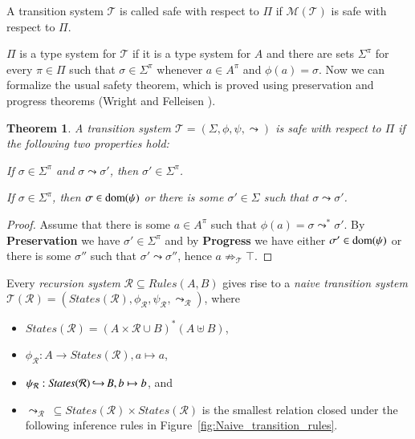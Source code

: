 \documentclass[a4paper,final,preprint,sort&compress]{elsarticle}
\newtheorem{theorem}[definition]{Theorem}
\newcommand{\M}{\ensuremath{\mathcal{M}}}
\newcommand{\R}{\ensuremath{\mathcal{R}}}
\newcommand{\T}{\ensuremath{\mathcal{T}}}
\newcommand{\Rules}{\ensuremath{\mathit{Rules}}}
\newcommand{\States}{\ensuremath{\mathit{States}}}
\begin{document}
A transition system $\T$ is called safe with respect to $\Pi$ if $\M(\T)$ is safe with respect to $\Pi$.

$\Pi$ is a type system for $\T$ if it is a type system for $A$ and there are sets $\Sigma^\pi$ for
every $\pi \in \Pi$ such that $\sigma \in \Sigma^\pi$ whenever $a \in A^\pi$ and $\phi(a) = \sigma$.
Now we can formalize the usual safety theorem, which is proved using preservation and progress
theorems (Wright and Felleisen \cite{WrightFelleisen94}).

\begin{theorem}
  A transition system $\T = (\Sigma,\phi,\psi,\leadsto)$ is safe with respect to $\Pi$
  if the following two properties hold:
  \begin{description}[labelindent=\parindent,style=nextline]
  \item[Preservation] 

    If $\sigma \in \Sigma^\pi$ and $\sigma \leadsto \sigma'$, then $\sigma' \in \Sigma^\pi$.

  \item[Progress] 

    If \mbox{$\sigma \in \Sigma^\pi$}, then \mbox{$\sigma \in \operatorname{dom}(\psi)$} or there is some
    \mbox{$\sigma' \in \Sigma$} such that \mbox{$\sigma \leadsto \sigma'$}.
    
  \end{description}
\end{theorem}

\begin{proof}
  Assume that there is some $a \in A^\pi$ such that \mbox{$\phi(a) = \sigma \leadsto^* \sigma'$}.
  By \textbf{Preservation} we have $\sigma' \in \Sigma^\pi$ and by \textbf{Progress} we have either
  $\sigma' \in \operatorname{dom}(\psi)$ or there is some $\sigma''$ such that $\sigma' \leadsto \sigma''$,
  hence $a \not\Rightarrow_\T \top$.
\end{proof}

Every \emph{recursion system} $\R \subseteq \Rules(A,B)$ gives rise to a \emph{naive transition system}
$\T(\R) = (\States(\R),\phi_\R,\psi_\R,\leadsto_\R)$, where
\begin{itemize}
\item $\States(\R) = (A \times \R \cup B)^*(A \uplus B)$,
\item $\phi_\R: A \to \States(\R), a \mapsto a$,
\item $\psi_\R: \States(\R) \pto B, b \mapsto b$, and
\item $\leadsto_\R~\subseteq \States(\R) \times \States(\R)$ is the smallest relation closed under the following
  inference rules in Figure~\ref{fig:Naive_transition_rules}.
\end{itemize}
\end{document}

